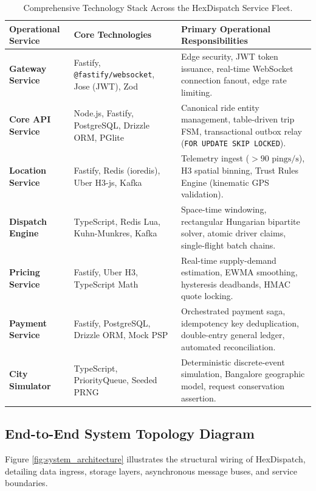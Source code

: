 \documentclass[11pt,a4paper]{article}
\begin{document}
\begin{table}[htbp]
\centering
\small
\begin{tabularx}{\textwidth}{l p{4.2cm} X}
\toprule
\textbf{Operational Service} & \textbf{Core Technologies} & \textbf{Primary Operational Responsibilities} \\
\midrule
\textbf{Gateway Service} & Fastify, \texttt{@fastify/websocket}, Jose (JWT), Zod & Edge security, JWT token issuance, real-time WebSocket connection fanout, edge rate limiting. \\
\rowcolor{HexLightBg}
\textbf{Core API Service} & Node.js, Fastify, PostgreSQL, Drizzle ORM, PGlite & Canonical ride entity management, table-driven trip FSM, transactional outbox relay (\texttt{FOR UPDATE SKIP LOCKED}). \\
\textbf{Location Service} & Fastify, Redis (ioredis), Uber H3-js, Kafka & Telemetry ingest ($>90\text{ pings/s}$), H3 spatial binning, Trust Rules Engine (kinematic GPS validation). \\
\rowcolor{HexLightBg}
\textbf{Dispatch Engine} & TypeScript, Redis Lua, Kuhn-Munkres, Kafka & Space-time windowing, rectangular Hungarian bipartite solver, atomic driver claims, single-flight batch chains. \\
\textbf{Pricing Service} & Fastify, Uber H3, TypeScript Math & Real-time supply-demand estimation, EWMA smoothing, hysteresis deadbands, HMAC quote locking. \\
\rowcolor{HexLightBg}
\textbf{Payment Service} & Fastify, PostgreSQL, Drizzle ORM, Mock PSP & Orchestrated payment saga, idempotency key deduplication, double-entry general ledger, automated reconciliation. \\
\textbf{City Simulator} & TypeScript, PriorityQueue, Seeded PRNG & Deterministic discrete-event simulation, Bangalore geographic model, request conservation assertion. \\
\bottomrule
\end{tabularx}
\caption{Comprehensive Technology Stack Across the HexDispatch Service Fleet.}
\label{tab:tech_stack}
\end{table}

\subsection{End-to-End System Topology Diagram}
Figure \ref{fig:system_architecture} illustrates the structural wiring of HexDispatch, detailing data ingress, storage layers, asynchronous message buses, and service boundaries.
\end{document}
